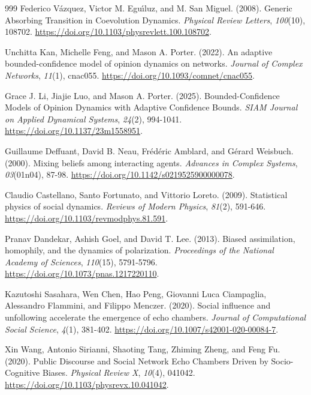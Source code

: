\documentclass[10pt,a4paper]{article}
\begin{document}
\begin{thebibliography}{999}
Federico V\'{a}zquez, Victor M. Egu\'{\i}luz, and M. San Miguel. (2008). Generic Absorbing Transition in Coevolution Dynamics. \textit{Physical Review Letters}, \textit{100}(10), 108702. \url{https://doi.org/10.1103/physrevlett.100.108702}.

Unchitta Kan, Michelle Feng, and Mason A. Porter. (2022). An adaptive bounded-confidence model of opinion dynamics on networks. \textit{Journal of Complex Networks}, \textit{11}(1), cnac055. \url{https://doi.org/10.1093/comnet/cnac055}.

Grace J. Li, Jiajie Luo, and Mason A. Porter. (2025). Bounded-Confidence Models of Opinion Dynamics with Adaptive Confidence Bounds. \textit{SIAM Journal on Applied Dynamical Systems}, \textit{24}(2), 994-1041. \url{https://doi.org/10.1137/23m1558951}.

Guillaume Deffuant, David B. Neau, Fr\'{e}d\'{e}ric Amblard, and G\'{e}rard Weisbuch. (2000). Mixing beliefs among interacting agents. \textit{Advances in Complex Systems}, \textit{03}(01n04), 87-98. \url{https://doi.org/10.1142/s0219525900000078}.

Claudio Castellano, Santo Fortunato, and Vittorio Loreto. (2009). Statistical physics of social dynamics. \textit{Reviews of Modern Physics}, \textit{81}(2), 591-646. \url{https://doi.org/10.1103/revmodphys.81.591}.

Pranav Dandekar, Ashish Goel, and David T. Lee. (2013). Biased assimilation, homophily, and the dynamics of polarization. \textit{Proceedings of the National Academy of Sciences}, \textit{110}(15), 5791-5796. \url{https://doi.org/10.1073/pnas.1217220110}.

Kazutoshi Sasahara, Wen Chen, Hao Peng, Giovanni Luca Ciampaglia, Alessandro Flammini, and Filippo Menczer. (2020). Social influence and unfollowing accelerate the emergence of echo chambers. \textit{Journal of Computational Social Science}, \textit{4}(1), 381-402. \url{https://doi.org/10.1007/s42001-020-00084-7}.

Xin Wang, Antonio Sirianni, Shaoting Tang, Zhiming Zheng, and Feng Fu. (2020). Public Discourse and Social Network Echo Chambers Driven by Socio-Cognitive Biases. \textit{Physical Review X}, \textit{10}(4), 041042. \url{https://doi.org/10.1103/physrevx.10.041042}.


\end{thebibliography}
\end{document}
